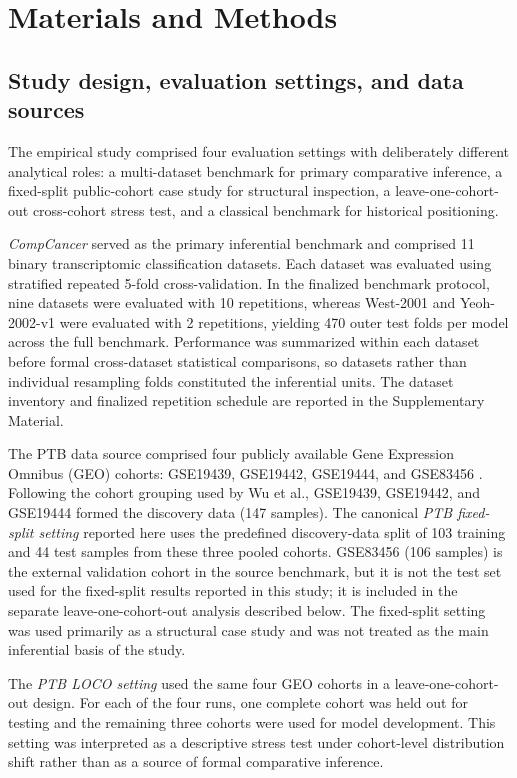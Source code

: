 \documentclass[journal]{IEEEtran}
\begin{document}
\section{Materials and Methods}\label{sec:methods}

\subsection{Study design, evaluation settings, and data sources}

The empirical study comprised four evaluation settings with deliberately different analytical roles: a multi-dataset benchmark for primary comparative inference, a fixed-split public-cohort case study for structural inspection, a leave-one-cohort-out cross-cohort stress test, and a classical benchmark for historical positioning.

\emph{CompCancer} served as the primary inferential benchmark and comprised 11 binary transcriptomic classification datasets. Each dataset was evaluated using stratified repeated 5-fold cross-validation. In the finalized benchmark protocol, nine datasets were evaluated with 10 repetitions, whereas West-2001 and Yeoh-2002-v1 were evaluated with 2 repetitions, yielding 470 outer test folds per model across the full benchmark. Performance was summarized within each dataset before formal cross-dataset statistical comparisons, so datasets rather than individual resampling folds constituted the inferential units. The dataset inventory and finalized repetition schedule are reported in the Supplementary Material.

The PTB data source comprised four publicly available Gene Expression Omnibus (GEO) cohorts: GSE19439, GSE19442, GSE19444, and GSE83456 \cite{Wu2025}. Following the cohort grouping used by Wu et al., GSE19439, GSE19442, and GSE19444 formed the discovery data (147 samples). The canonical \emph{PTB fixed-split setting} reported here uses the predefined discovery-data split of 103 training and 44 test samples from these three pooled cohorts. GSE83456 (106 samples) is the external validation cohort in the source benchmark, but it is not the test set used for the fixed-split results reported in this study; it is included in the separate leave-one-cohort-out analysis described below. The fixed-split setting was used primarily as a structural case study and was not treated as the main inferential basis of the study.

The \emph{PTB LOCO setting} used the same four GEO cohorts in a leave-one-cohort-out design. For each of the four runs, one complete cohort was held out for testing and the remaining three cohorts were used for model development. This setting was interpreted as a descriptive stress test under cohort-level distribution shift rather than as a source of formal comparative inference.
\end{document}
